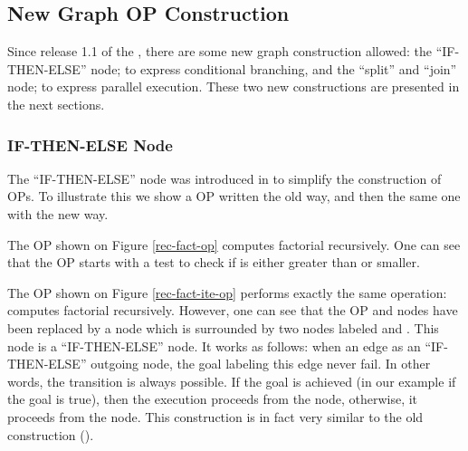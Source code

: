 \subsection{New Graph OP Construction}

Since release 1.1 of the \COPRSDE{}, there are some new graph construction
allowed: the ``IF-THEN-ELSE'' node; to express conditional branching, and the
``split'' and ``join'' node; to express parallel execution. These two new
constructions are presented in the next sections.



\subsubsection{IF-THEN-ELSE Node}

The ``IF-THEN-ELSE'' node was introduced in \COPRS{} to simplify the
construction of OPs. To illustrate this we show a OP written the old way, and
then the same one with the new way.


The OP shown on Figure \ref{rec-fact-op} computes factorial recursively.
One can see that the OP starts with a test to check if  is either
greater than  or smaller.


The OP shown on Figure \ref{rec-fact-ite-op} performs exactly the same
operation: computes factorial recursively. However, one can see that the OP
 and  nodes have been replaced by a  node which is
surrounded by two nodes labeled  and . This node  is
a ``IF-THEN-ELSE'' node. It works as follows: when an edge as an
``IF-THEN-ELSE'' outgoing node, the goal labeling this edge never fail. In
other words, the transition is always possible. If the goal is achieved (in our
example if the goal  is true), then the execution proceeds
from the  node, otherwise, it proceeds from the  node. This
construction is in fact very similar to the old  construction
().


